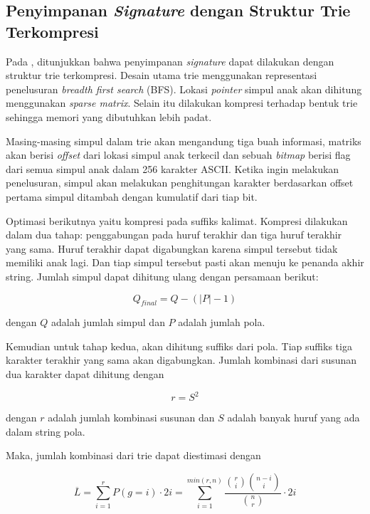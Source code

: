   \subsection{Penyimpanan \emph{Signature} dengan Struktur Trie Terkompresi}

    Pada \parencite{bellekens2014}, ditunjukkan bahwa penyimpanan \emph{signature} dapat dilakukan dengan struktur trie terkompresi. Desain utama trie menggunakan representasi penelusuran \emph{breadth first search} (BFS). Lokasi \emph{pointer} simpul anak akan dihitung menggunakan \emph{sparse matrix}. Selain itu dilakukan kompresi terhadap bentuk trie sehingga memori yang dibutuhkan lebih padat.

    Masing-masing simpul dalam trie akan mengandung tiga buah informasi, matriks akan berisi \emph{offset} dari lokasi simpul anak terkecil dan sebuah \emph{bitmap} berisi flag dari semua simpul anak dalam 256 karakter ASCII. Ketika ingin melakukan penelusuran, simpul akan melakukan penghitungan karakter berdasarkan offset pertama simpul ditambah dengan kumulatif dari tiap bit.

    Optimasi berikutnya yaitu kompresi pada suffiks kalimat. Kompresi dilakukan dalam dua tahap: penggabungan pada huruf terakhir dan tiga huruf terakhir yang sama. Huruf terakhir dapat digabungkan karena simpul tersebut tidak memiliki anak lagi. Dan tiap simpul tersebut pasti akan menuju ke penanda akhir string. Jumlah simpul dapat dihitung ulang dengan persamaan berikut:

    \begin{equation}
      Q_{final} = Q - \left(\left|P\right| - 1 \right)
    \end{equation}

    dengan $Q$ adalah jumlah simpul dan $P$ adalah jumlah pola.

    Kemudian untuk tahap kedua, akan dihitung suffiks dari pola. Tiap suffiks tiga karakter terakhir yang sama akan digabungkan. Jumlah kombinasi dari susunan dua karakter dapat dihitung dengan

    \begin{equation}
      r = S^2
    \end{equation}

    dengan $r$ adalah jumlah kombinasi susunan dan $S$ adalah banyak huruf yang ada dalam string pola.

    Maka, jumlah kombinasi dari trie dapat diestimasi dengan

    \begin{equation}
      \overline{L} = 
        \sum_{i=1}^{r} P\left(g = i \right) \cdot 2i =
          \sum_{i=1}^{min\left({r,n} \right)} \frac{\binom{r}{i} \binom{n - i}{i}}{\binom{n}{r}} \cdot 2i
    \end{equation}

